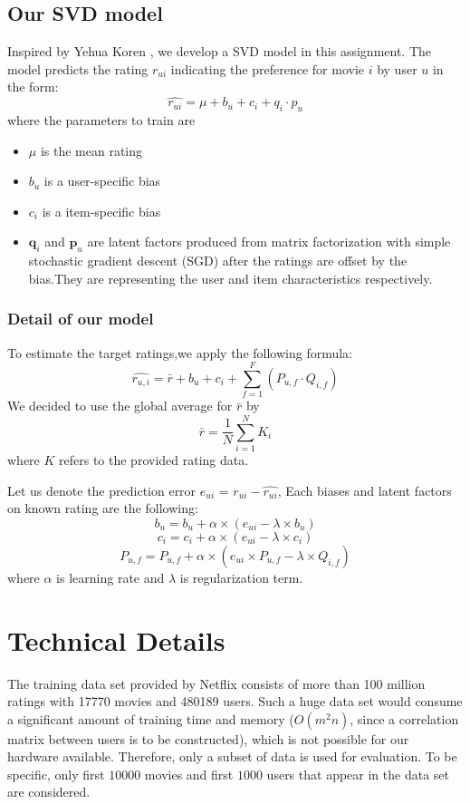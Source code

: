 \documentclass[final]{cvpr}
\begin{document}
\subsection{Our SVD model}
Inspired by Yehua Koren \cite{FactorMeet}, we develop a SVD model in this assignment. The model predicts the rating $r_{ui}$ indicating the preference for movie $i$ by user $u$ in the form:
$$\hat{r_{ui}} = \mu + b_u + c_i + q_i \cdot p_u$$
where the parameters to train are \begin{itemize}
	\item $\mu$ is the mean rating
	\item $b_u$ is a user-specific bias 
	\item $c_i$ is a item-specific bias 
	\item $\mathbf q_i$ and $\mathbf p_u$ are latent factors
		produced from matrix factorization with simple stochastic gradient descent (SGD)
		after the ratings are offset by the bias.They are representing the user and item characteristics respectively.
\end{itemize}


\subsubsection{Detail of our model}

To estimate the target ratings,we apply the following formula:
$$ \hat{r_{u,i}} = \bar{r}+b_u + c_i + \sum_{f=1}^F (P_{u,f} \cdot Q_{i,f}) $$
We decided to use the global average for $\bar{r}$ by
$$\bar{r} = \frac{1}{N} \sum^{N}_{i=1} K_i$$
where $K$ refers to the provided rating data.

Let us denote the prediction error $e_{ui}$ = $r_{ui} - \hat{r_{ui}}$,
Each biases and latent factors on known rating are the following:
$$ b_u = b_u + \alpha \times (e_{ui} - \lambda \times b_u)$$
$$ c_i = c_i + \alpha \times (e_{ui} - \lambda \times c_i)$$
$$ P_{u,f} = P_{u,f} +  \alpha \times (e_{ui} \times P_{u,f} - \lambda \times Q_{i,f})$$
where $\alpha$ is learning rate and $\lambda$ is regularization term.

\section{Technical Details}
The training data set provided by Netflix consists of more than 100 million ratings with 17770 movies and 480189 users.
Such a huge data set would consume a significant amount of training time and memory
($O(m^2 n)$, since a correlation matrix between users is to be constructed),
which is not possible for our hardware available.
Therefore, only a subset of data is used for evaluation.
To be specific, only first $10000$ movies and first $1000$ users that appear in the data set are considered.
\end{document}
